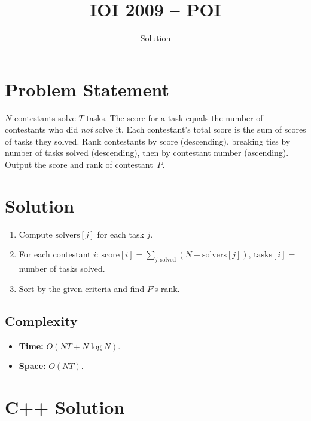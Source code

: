 \documentclass[11pt,a4paper]{article}
\title{IOI 2009 -- POI}
\author{Solution}
\date{}
\begin{document}
\maketitle

\section{Problem Statement}
$N$ contestants solve $T$ tasks. The score for a task equals the number of contestants who did \emph{not} solve it. Each contestant's total score is the sum of scores of tasks they solved. Rank contestants by score (descending), breaking ties by number of tasks solved (descending), then by contestant number (ascending). Output the score and rank of contestant~$P$.

\section{Solution}
\begin{enumerate}
    \item Compute $\text{solvers}[j]$ for each task $j$.
    \item For each contestant $i$: $\text{score}[i] = \sum_{j:\text{solved}} (N - \text{solvers}[j])$, $\text{tasks}[i] = $ number of tasks solved.
    \item Sort by the given criteria and find $P$'s rank.
\end{enumerate}

\subsection{Complexity}
\begin{itemize}
    \item \textbf{Time:} $O(NT + N \log N)$.
    \item \textbf{Space:} $O(NT)$.
\end{itemize}

\section{C++ Solution}
\end{document}
